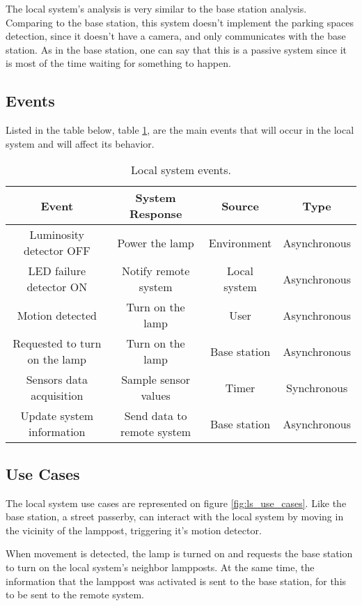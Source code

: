 The local system's analysis is very similar to the base station analysis. Comparing to the base station, this system doesn't implement the parking spaces detection, since it doesn't have a camera, and only communicates with the base station. As in the base station, one can say that this is a passive system since it is most of the time waiting for something to happen.

\subsection{Events}
Listed in the table below, table \ref{table:ls_events}, are the main events that will occur in the local system and will affect its behavior. 

\begin{table}[h]
	\centering
	\resizebox{\columnwidth}{!}
	{
	\begin{tabular}{||c | c | c | c||} 
		\hline
		\textbf{Event} & \textbf{System Response} & \textbf{Source} & \textbf{Type}\\
		\hline\hline
Luminosity detector OFF & Power the lamp & Environment & Asynchronous\\\hline
LED failure detector ON & Notify remote system & Local system & Asynchronous\\\hline
Motion detected & Turn on the lamp & User & Asynchronous\\\hline
Requested to turn on the lamp & Turn on the lamp & Base station & Asynchronous\\\hline
Sensors data acquisition & Sample sensor values & Timer & Synchronous\\\hline
Update system information & Send data to remote system & Base station & Asynchronous\\
		\hline
	\end{tabular}
	}
	
	\caption{Local system events.}
	\label{table:ls_events}
\end{table}

\subsection{Use Cases}
The local system use cases are represented on figure \ref{fig:ls_use_cases}. Like the base station, a street passerby, can interact with the local system by moving in the vicinity of the lamppost, triggering it's motion detector.

When movement is detected, the lamp is turned on and requests the base station to turn on the local system's neighbor lampposts. At the same time, the information that the lamppost was activated is sent to the base station, for this to be sent to the remote system.

